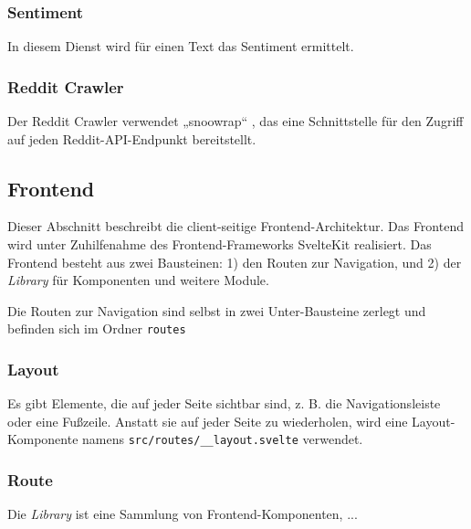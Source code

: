 \documentclass[a4paper, 10pt, conference]{IEEEtran}
\begin{document}
\subsubsection{Sentiment}

In diesem Dienst wird für einen Text das Sentiment ermittelt. 

\subsubsection{Reddit Crawler}

Der Reddit Crawler verwendet „snoowrap“ \cite{snoowrap},  das eine Schnittstelle für den Zugriff auf jeden Reddit-API-Endpunkt bereitstellt.

\subsection{Frontend} \label{sub:frontend}
Dieser Abschnitt beschreibt die client-seitige Frontend-Architektur. Das Frontend wird unter Zuhilfenahme des Frontend-Frameworks SvelteKit \cite{sveltekit} realisiert. Das Frontend besteht aus zwei Bausteinen: 1) den Routen zur Navigation, und 2) der \textit{Library} für Komponenten und weitere Module.

Die Routen zur Navigation sind selbst in zwei Unter-Bausteine zerlegt und befinden sich im Ordner \texttt{routes}

\subsubsection{Layout}

Es gibt Elemente, die auf jeder Seite sichtbar sind, z. B. die Navigationsleiste oder eine Fußzeile. Anstatt sie auf jeder Seite zu wiederholen,  wird eine Layout-Komponente namens \texttt{src/routes/\_\_layout.svelte} verwendet.

\subsubsection{Route}


Die \textit{Library} ist eine Sammlung von Frontend-Komponenten,  ...
\end{document}
